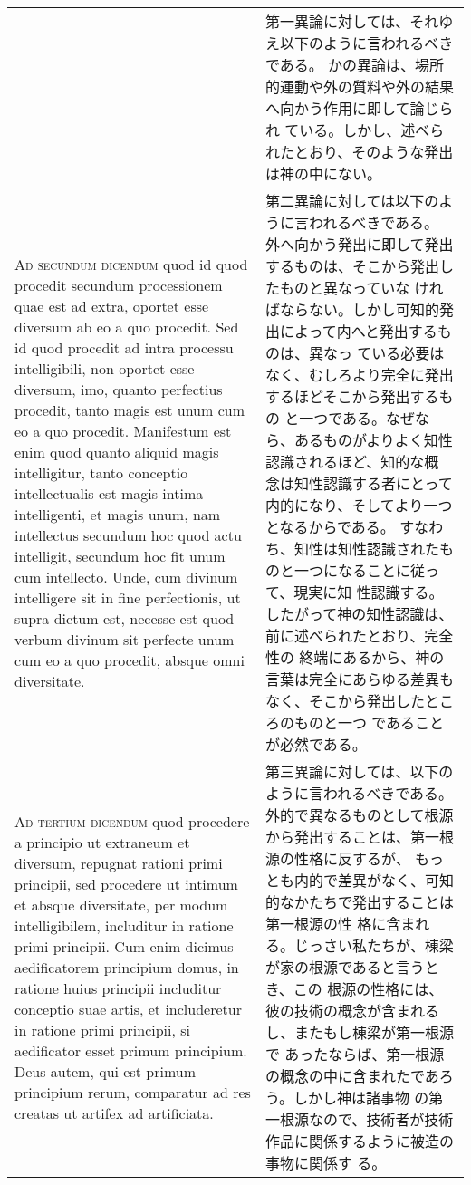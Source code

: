 \documentclass[10pt]{jsarticle} %
\begin{document}
\begin{longtable}{p{21em}p{21em}}
&

第一異論に対しては、それゆえ以下のように言われるべきである。
かの異論は、場所的運動や外の質料や外の結果へ向かう作用に即して論じられ
 ている。しかし、述べられたとおり、そのような発出は神の中にない。

\\



{\scshape Ad secundum dicendum} quod id quod procedit secundum processionem quae
est ad extra, oportet esse diversum ab eo a quo procedit. Sed id quod
procedit ad intra processu intelligibili, non oportet esse diversum,
imo, quanto perfectius procedit, tanto magis est unum cum eo a quo
procedit. Manifestum est enim quod quanto aliquid magis intelligitur,
tanto conceptio intellectualis est magis intima intelligenti, et magis
unum, nam intellectus secundum hoc quod actu intelligit, secundum hoc
fit unum cum intellecto. Unde, cum divinum intelligere sit in fine
perfectionis, ut supra dictum est, necesse est quod verbum divinum sit
perfecte unum cum eo a quo procedit, absque omni diversitate.


&

第二異論に対しては以下のように言われるべきである。
外へ向かう発出に即して発出するものは、そこから発出したものと異なっていな
 ければならない。しかし可知的発出によって内へと発出するものは、異なっ
 ている必要はなく、むしろより完全に発出するほどそこから発出するもの
 と一つである。なぜなら、あるものがよりよく知性認識されるほど、知的な概
 念は知性認識する者にとって内的になり、そしてより一つとなるからである。
 すなわち、知性は知性認識されたものと一つになることに従って、現実に知
 性認識する。したがって神の知性認識は、前に述べられたとおり、完全性の
 終端にあるから、神の言葉は完全にあらゆる差異もなく、そこから発出したところのものと一つ
 であることが必然である。


\\



{\scshape Ad tertium dicendum} quod procedere a principio ut extraneum et diversum,
repugnat rationi primi principii, sed procedere ut intimum et absque
diversitate, per modum intelligibilem, includitur in ratione primi
principii. Cum enim dicimus aedificatorem principium domus, in ratione
huius principii includitur conceptio suae artis, et includeretur in
ratione primi principii, si aedificator esset primum principium. Deus
autem, qui est primum principium rerum, comparatur ad res creatas ut
artifex ad artificiata.


&

第三異論に対しては、以下のように言われるべきである。
外的で異なるものとして根源から発出することは、第一根源の性格に反するが、
 もっとも内的で差異がなく、可知的なかたちで発出することは第一根源の性
 格に含まれる。じっさい私たちが、棟梁が家の根源であると言うとき、この
 根源の性格には、彼の技術の概念が含まれるし、またもし棟梁が第一根源で
 あったならば、第一根源の概念の中に含まれたであろう。しかし神は諸事物
 の第一根源なので、技術者が技術作品に関係するように被造の事物に関係す
 る。


\end{longtable}
\newpage
\end{document}
